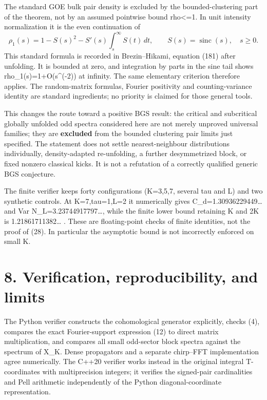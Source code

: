 \documentclass[11pt,a4paper]{article}
\begin{document}
The standard GOE bulk pair density is excluded by the bounded-clustering part of the theorem, not by an assumed pointwise bound rho\textless=1. In unit intensity normalization it is the even continuation of \[
 \rho_1(s)=1-S(s)^2-S'(s)\int_s^\infty S(t)\,dt,\qquad
 S(s)=\operatorname{sinc}(s),\quad s\geq0.                       \tag{32}
\] This standard formula is recorded in Brezin--Hikami, equation (181) after unfolding. It is bounded at zero, and integration by parts in the sine tail shows rho\_1(s)=1+O(s\^{}(-2)) at infinity. The same elementary criterion therefore applies. The random-matrix formulas, Fourier positivity and counting-variance identity are standard ingredients; no priority is claimed for those general tools.

This changes the route toward a positive BGS result: the critical and subcritical globally unfolded odd spectra considered here are not merely unproved universal families; they are \textbf{excluded} from the bounded clustering pair limits just specified. The statement does not settle nearest-neighbour distributions individually, density-adapted re-unfolding, a further desymmetrized block, or fixed nonzero classical kicks. It is not a refutation of a correctly qualified generic BGS conjecture.

The finite verifier keeps forty configurations (K=3,5,7, several tau and L) and two synthetic controls. At K=7,tau=1,L=2 it numerically gives C\_d=1.30936229449\ldots{} and Var N\_L=3.23744917797\ldots, while the finite lower bound retaining K and 2K is 1.21861711382\ldots{} . These are floating-point checks of finite identities, not the proof of (28). In particular the asymptotic bound is not incorrectly enforced on small K.

\hypertarget{verification-reproducibility-and-limits}{%
\section{8. Verification, reproducibility, and limits}\label{verification-reproducibility-and-limits}}

The Python verifier constructs the cohomological generator explicitly, checks (4), compares the exact Fourier-support expression (12) to direct matrix multiplication, and compares all small odd-sector block spectra against the spectrum of X\_K. Dense propagators and a separate chirp--FFT implementation agree numerically. The C++20 verifier works instead in the original integral T-coordinates with multiprecision integers; it verifies the signed-pair cardinalities and Pell arithmetic independently of the Python diagonal-coordinate representation.
\end{document}
